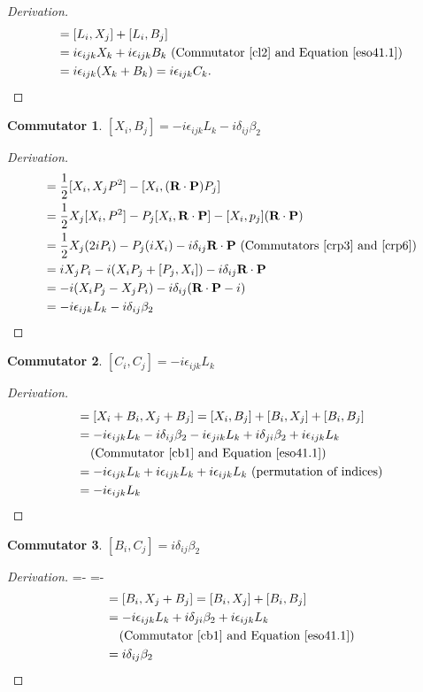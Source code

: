 \documentclass[12pt,a4paper]{report}
\theoremstyle{definition}
\newtheorem{commutator}{Commutator}[section]
\newenvironment{derivation}
  {\renewcommand\qedsymbol{$\square$}\begin{proof}[Derivation]}
  {\end{proof}}
\theoremstyle{remark}
\theoremstyle{remark}
\begin{document}
\begin{appendices}
\begin{derivation}
\begin{align*}
[L_i,C_j]&=[L_i,X_j]+[L_i,B_j]\\
&=i\epsilon_{ijk}X_k+i\epsilon_{ijk}B_k \text{ (Commutator~\ref{cl2} and Equation~\ref{eso41.1})}\\
&=i\epsilon_{ijk}(X_k+B_k)=i\epsilon_{ijk}C_k.
\end{align*}
\end{derivation}
\begin{commutator}\label{cb1}
$[X_i,B_j]=-i\epsilon_{ijk}L_k-i\delta_{ij}\beta_2$
\end{commutator}
\begin{derivation} 
\begin{align*}
[X_i,B_j]&=\frac{1}{2}[X_i,X_jP^2]-[X_i,(\textbf{R}\cdot\textbf{P})P_j]\\
&= \frac{1}{2}X_j[X_i,P^2]-P_j[X_i,\textbf{R}\cdot\textbf{P}]-[X_i,p_j](\textbf{R}\cdot\textbf{P})\\
&=\frac{1}{2}X_j(2iP_i)-P_j(iX_i)-i\delta_{ij}\textbf{R}\cdot\textbf{P} \text{ (Commutators~\ref{crp3} and~\ref{crp6})}\\
&=iX_jP_i-i(X_iP_j+[P_j,X_i])-i\delta_{ij}\textbf{R}\cdot\textbf{P} \\
&=-i(X_iP_j-X_jP_i)-i\delta_{ij}(\textbf{R}\cdot\textbf{P}-i)\\
&=-i\epsilon_{ijk}L_k-i\delta_{ij}\beta_2
\end{align*}
\end{derivation}
\begin{commutator}\label{cc2}
$[C_i,C_j]=-i\epsilon_{ijk}L_k$
\end{commutator}
\begin{derivation} 
\begin{align*}
[C_i,C_j]&=[X_i+B_i,X_j+B_j]=[X_i,B_j]+[B_i,X_j]+[B_i,B_j]\\
&=-i\epsilon_{ijk}L_k-i\delta_{ij}\beta_2-i\epsilon_{jik}L_k+i\delta_{ji}\beta_2+i\epsilon_{ijk}L_k \\
&\phantom{=}\text{ (Commutator~\ref{cb1} and Equation~\ref{eso41.1})}\\
&=-i\epsilon_{ijk}L_k+i\epsilon_{ijk}L_k+i\epsilon_{ijk}L_k\text{ (permutation of indices)}\\
&=-i\epsilon_{ijk}L_k
\end{align*}
\end{derivation}

\begin{commutator}\label{cc3}
$[B_i,C_j]=i\delta_{ij}\beta_2$
\end{commutator}
\begin{derivation} 
\abovedisplayskip=-\baselineskip
\belowdisplayskip=0pt
\abovedisplayshortskip=-\baselineskip
\belowdisplayshortskip=0pt
\begin{align*}
[B_i,C_j]&=[B_i,X_j+B_j]=[B_i,X_j]+[B_i,B_j]\\
&=-i\epsilon_{ijk}L_k+i\delta_{ji}\beta_2+i\epsilon_{ijk}L_k \\
&\phantom{=}\text{ (Commutator~\ref{cb1} and Equation~\ref{eso41.1})}\\
&=i\delta_{ij}\beta_2
\end{align*}
\end{derivation}


\end{appendices}
\end{document}
